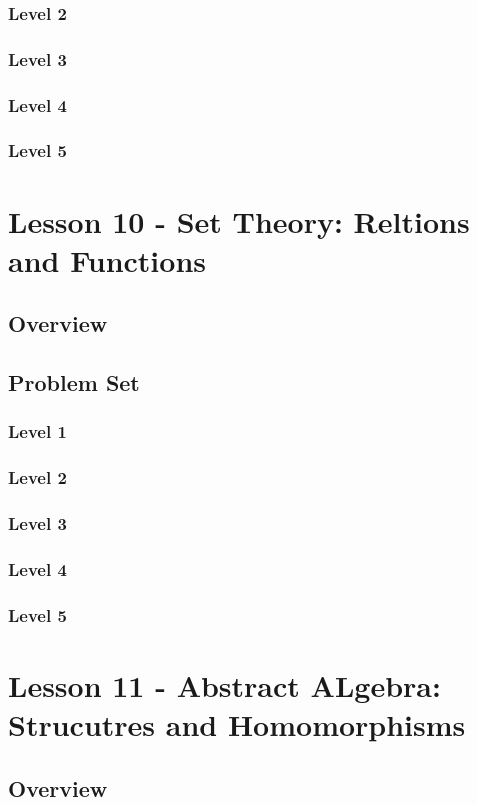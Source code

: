 \documentclass{article}
\begin{document}
\subsubsection{Level 2}
\subsubsection{Level 3}
\subsubsection{Level 4}
\subsubsection{Level 5}
\pagebreak

\section{Lesson 10 - Set Theory: Reltions and Functions}
\subsection{Overview}
\subsection{Problem Set}
\subsubsection{Level 1}
\subsubsection{Level 2}
\subsubsection{Level 3}
\subsubsection{Level 4}
\subsubsection{Level 5}
\pagebreak

\section{Lesson 11 - Abstract ALgebra: Strucutres and Homomorphisms}
\subsection{Overview}
\end{document}
